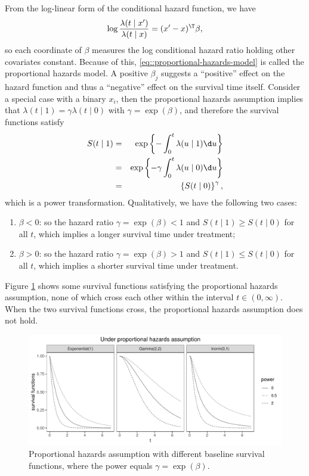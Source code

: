 From the log-linear form of the conditional hazard function, we have
$$
\log \frac{\lambda(t\mid x')}{ \lambda(t\mid x)} = (x' - x)^{\T} \beta,
$$
so each coordinate of $\beta$ measures the log conditional hazard ratio holding other covariates constant. 
Because of this, \eqref{eq::proportional-hazards-model} is called the proportional hazards model. 
A positive $\beta_j$ suggests a ``positive'' effect on the hazard function and thus a ``negative'' effect on the survival time itself. 
Consider a special case with a binary $x_i$, then the proportional hazards assumption implies that $\lambda(t\mid 1) = \gamma  \lambda(t\mid 0)$ with $\gamma=\exp(\beta)$, and therefore the survival functions satisfy
\begin{eqnarray*}
S(t\mid 1) 
&=& \exp\left\{  - \int_0^t  \lambda(u\mid 1) \d u  \right\} \\
&=&  \exp\left\{  - \gamma  \int_0^t  \lambda(u\mid 0) \d u  \right\}  \\
&=& \left\{  S(t\mid 0) \right\}^\gamma,
\end{eqnarray*}
which is a power transformation. 
Qualitatively, we have the following two cases:
\begin{enumerate}
[(PH1)]
\item
$\beta <0$: so the hazard ratio $\gamma = \exp(\beta) < 1$ and $S(t\mid 1) \geq  S(t\mid 0)$ for all $t$, which implies a longer survival time under treatment;
\item 
$\beta >0$: so the hazard ratio $\gamma = \exp(\beta) > 1$ and $S(t\mid 1) \leq  S(t\mid 0)$ for all $t$, which implies a shorter survival time under treatment.
\end{enumerate}
Figure \ref{fig::ph-assumptions} shows some survival functions satisfying the proportional hazards assumption, none of which cross each other within the interval $t\in (0,\infty).$ When the two survival functions cross, the proportional hazards assumption does not hold. 


\begin{figure}
\centering
\includegraphics[width = \textwidth]{figures/ph_survival_curves.pdf}
\caption{Proportional hazards assumption with different baseline survival functions, where the power equals $\gamma = \exp(\beta)$.
}\label{fig::ph-assumptions}
\end{figure}

